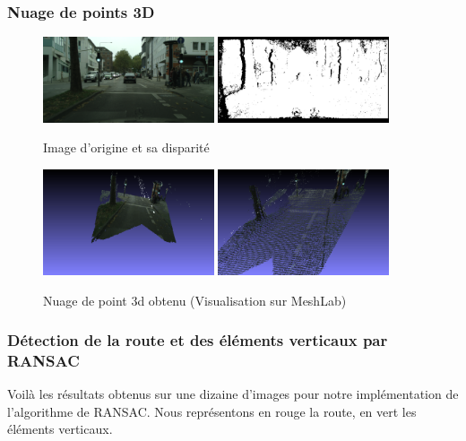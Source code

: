 \documentclass[titlepage,11pt,a4paper]{article}
\begin{document}
\subsubsection{Nuage de points 3D}
\begin{figure}[H]
  \centering
    \includegraphics[width=0.45\textwidth]{images/aachen_000029_000019_leftImg8bit.png}
  \hfill{}
    \includegraphics[width=0.45\textwidth]{images/aachen_000029_000019_disparity.png}
  \hfill 
  \caption{Image d'origine et sa disparité}
\end{figure} 
\begin{figure}[H]
  \centering
    \includegraphics[width=0.45\textwidth]{images/3dpointcloud00.png}
  \hfill{}
    \includegraphics[width=0.45\textwidth]{images/3dpointcloud01.png}
  \hfill 
  \caption{Nuage de point 3d obtenu (Visualisation sur MeshLab)}
\end{figure} 

\subsubsection{Détection de la route et des éléments verticaux par RANSAC}
\par Voilà les résultats obtenus sur une dizaine d'images pour notre implémentation de l'algorithme de RANSAC. Nous représentons en rouge la route, en vert les éléments verticaux.
\end{document}
